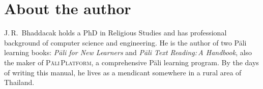 \cleardoublepage
{}
{}
\chapter*{About the author}

J.\,R.\ Bhaddacak holds a PhD in Religious Studies and has professional background of computer science and engineering. He is the author of two Pāli learning books: \textit{Pāli for New Learners} and \textit{Pāli Text Reading:\,A Handbook}, also the maker of \textsc{Pāli\,Plat\-form}, a comprehensive Pāli learning program. By the days of writing this manual, he lives as a mendicant somewhere in a rural area of Thailand.
